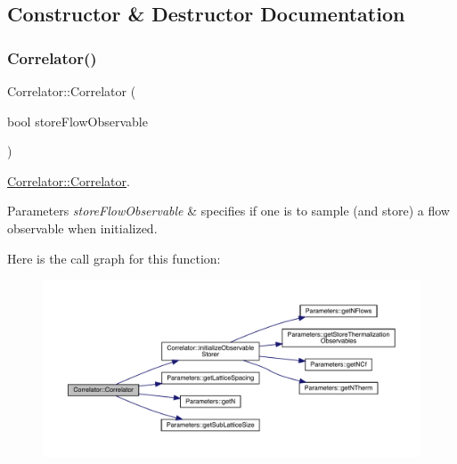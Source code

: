 \subsection{Constructor \& Destructor Documentation}
\mbox{\label{class_correlator_aff48ef3bf789e9c6231eacc21cd9ed9a}} 
\subsubsection{\texorpdfstring{Correlator()}{Correlator()}\hspace{0.1cm}{\footnotesize\ttfamily [1/2]}}
{\footnotesize\ttfamily Correlator\+::\+Correlator (\begin{DoxyParamCaption}\item[{bool}]{store\+Flow\+Observable }\end{DoxyParamCaption})}



\mbox{\hyperlink{class_correlator_aff48ef3bf789e9c6231eacc21cd9ed9a}{Correlator\+::\+Correlator}}. 


\begin{DoxyParams}{Parameters}
{\em store\+Flow\+Observable} & specifies if one is to sample (and store) a flow observable when initialized. \\
\hline
\end{DoxyParams}
Here is the call graph for this function\+:
\nopagebreak
\begin{figure}[H]
\begin{center}
\leavevmode
\includegraphics[width=350pt]{class_correlator_aff48ef3bf789e9c6231eacc21cd9ed9a_cgraph}
\end{center}
\end{figure}
\mbox{\label{class_correlator_a6114955836dba0b4b61138490cd3fe91}} 
